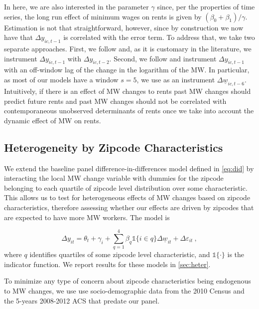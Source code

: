 In here, we are also interested in the parameter $\gamma$ since, per the properties of time
series, the long run effect of minimum wages on rents is given by 
$(\beta_0 + \beta_1)/\gamma$. %
Estimation is not that straightforward, however, since by construction we now have that 
$\Delta y_{ic,t-1}$ is correlated with the error term. To address that, we take two separate 
approaches. First, we follow \textcite{ArellanoBond1991} %
and, as it is customary in the literature, we instrument $\Delta y_{ic,t-1}$ with
$\Delta y_{ic,t-2}$. Second, we follow \textcite{MeerWest2016} and instrument 
$\Delta y_{ic,t-1}$ with an off-window lag of the change in the logarithm of the MW. 
In particular, as most of our models have a window $s=5$, we use as an instrument 
$\Delta \underline{w}_{ic,t-6}$. Intuitively, if there is an effect of MW changes to 
rents past MW changes should predict future rents and past MW changes should not be 
correlated with contemporaneous unobserved determinants of rents once we take into account 
the dynamic effect of MW on rents. 


\subsection{Heterogeneity by Zipcode Characteristics}

We extend the baseline panel difference-in-differences model defined in \autoref{eq:did} 
by interacting the local MW change variable with dummies for the zipcode belonging to each 
quartile of zipcode level distribution over some characteristic. This allows us to 
test for heterogeneous effects of MW changes based on zipcode characteristics, therefore
assessing whether our effects are driven by zipcodes that are expected to have more 
MW workers. The model is

\begin{equation}\label{eq:diff_main_hetero} 
    \Delta y_{it} = \theta_t + \gamma_i 
    		+ \sum_{q = 1}^4 \beta_q \mathds{1}\{i \in q\} \Delta \underline{w}_{it} 
    		+ \Delta \varepsilon_{it} \ ,
\end{equation}
where $q$ identifies quartiles of some zipcode level characteristic, and $\mathds{1}\{ \cdot \}$ is 
the indicator function. We report results for these models in \autoref{sec:heter}.

To minimize any type of concern about zipcode characteristics being endogenous to MW changes, 
we use use socio-demographic data from the 2010 Census and the 5-years 2008-2012 ACS that predate 
our panel.

